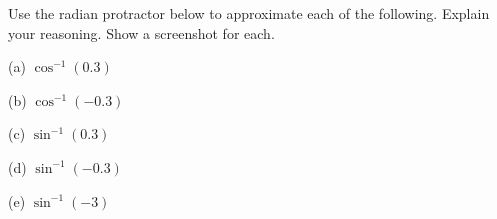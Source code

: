 \documentclass{ximera}
\begin{document}
\begin{question} \label{Ex1dsfsdafgt4hh:Inverse}
Use the radian protractor below to approximate each of the following. Explain your reasoning. Show a screenshot for each.

(a) $\cos^{-1}(0.3)$

(b) $\cos^{-1}(-0.3)$

(c) $\sin^{-1}(0.3)$

(d) $\sin^{-1}(-0.3)$

(e) $\sin^{-1}(-3)$


\begin{exploration}\label{Exp3:Comp}

 
\begin{onlineOnly}
    \begin{center}
\end{center}
\end{onlineOnly}
\end{exploration}

\end{question}
\end{document}
